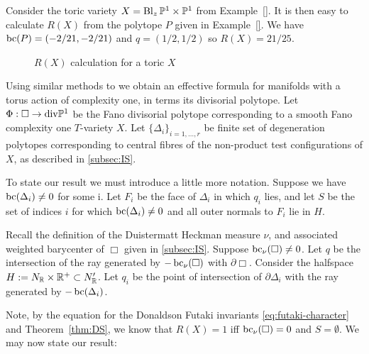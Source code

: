 \begin{example}
Consider the toric variety \(X = \operatorname{Bl}_z \mathbb{P}^1 \times \mathbb{P}^1\) from Example~\ref{}. It is then easy to calculate \(R(X)\) from the polytope \(P\) given in Example~\ref{}. We have \(\mathop{\rm bc}\nolimits(P) = (-2/21,-2/21)\) and \(q = (1/2,1/2)\) so \(R(X) = 21/25\).
\begin{figure}[h]
\centering
	\caption{$R(X)$ calculation for a toric $X$}
\end{figure}
\end{example}

Using similar methods to \cite{datar2016kahler} we obtain an effective formula for manifolds with a torus action of complexity one, in terms its divisorial polytope. Let \(\Phi: \Box \to \text{div} \mathbb{P}^1\) be the Fano divisorial polytope corresponding to a smooth Fano complexity one \(T\)-variety \(X\). Let \(\{\Delta_i\}_{i=1,\dots,r}\) be finite set of degeneration polytopes corresponding to central fibres of the non-product test configurations of \(X\), as described in \ref{subsec:IS}.

To state our result we must introduce a little more notation. Suppose we have \(\mathop{\rm bc}\nolimits(\Delta_i) \neq 0\) for some i. Let \(F_i\) be  the face of \(\Delta_i\) in which \(q_i\) lies, and let \(S\) be the set of indices \(i\) for which \(\mathop{\rm bc}\nolimits(\Delta_i) \neq 0\) and all outer normals to \(F_i\) lie in \(H\).


Recall the definition of the Duistermatt Heckman measure \(\nu\), and associated weighted barycenter of \(\Box\) given in \ref{subsec:IS}. Suppose \(\mathop{\rm bc}\nolimits_\nu(\Box) \neq 0\). Let \(q\) be the intersection of the ray generated by \(-\mathop{\rm bc}\nolimits_\nu(\Box)\) with \(\partial \Box\). Consider the halfspace \(H := N_{\mathbb{R}} \times \mathbb{R}^+ \subset N'_{\mathbb{R}}\). Let \(q_i\) be the point of intersection of \(\partial \Delta_i\) with the ray generated by \(-\mathop{\rm bc}\nolimits(\Delta_i)\).

Note, by the equation for the Donaldson Futaki invariants \ref{eq:futaki-character} and Theorem~\ref{thm:DS}, we know that \(R(X) = 1\) iff \(\mathop{\rm bc}\nolimits_\nu(\Box) = 0\) and \(S = \emptyset\). We may now state our result:

